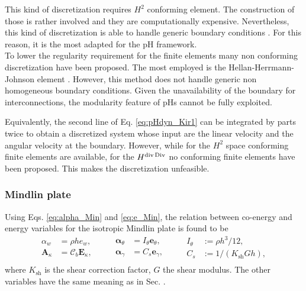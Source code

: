 This kind of discretization requires $H^2$ conforming element. The construction of those is rather involved \cite{argyris1968,bell1969} and they are computationally expensive. Nevertheless, this kind of discretization is able to handle generic boundary conditions \cite{gustafsson2018}. For this reason, it is the most adapted for the pH framework. \\

To lower the regularity requirement for the finite elements many non conforming discretization have been proposed. The most employed is the Hellan-Herrmann-Johnson element \cite{arnold1985mixed,blum1990}. However, this method does not handle generic non homogeneous boundary conditions. Given the unavailability of the boundary for interconnections, the modularity feature of pHs cannot be fully exploited. \\

\begin{remark}\label{rmk:HdivDiv}
	Equivalently, the second line of Eq. \eqref{eq:pHdyn_Kir1} can be integrated by parts twice to obtain a discretized system whose input are the linear velocity and the angular velocity at the boundary. However, while for the $H^2$ space conforming finite elements are available, for the $H^{\operatorname{div}\operatorname*{Div}}$ no conforming finite elements have been proposed. This makes the discretization unfeasible. 
\end{remark}

\subsubsection{Mindlin plate}
Using Eqs. \eqref{eq:alpha_Min} and \eqref{eq:e_Min}, the relation between co-energy and energy variables for the isotropic Mindlin plate is found to be
\begin{equation}
\begin{aligned}
\alpha_w &= \rho h e_w, \\
\bm{A}_{\kappa} &= \bm{\mathcal{C}}_b \bm{E}_\kappa,\\
\end{aligned} \qquad
\begin{aligned}
\bm{\alpha}_{\theta} &= I_\theta \bm{e}_\theta,\\
\bm{\alpha}_{\gamma} &= C_s \bm{e}_{\gamma}, \\
\end{aligned} \qquad
\begin{aligned}
I_\theta &:= {\rho h^3}/{12},\\
C_s &:= {1}/{(K_{\text{sh}}Gh)}, \\
\end{aligned}
\end{equation}
where $K_{\text{sh}}$ is the shear correction factor, $G$ the shear modulus. The other variables have the same meaning as in Sec. . 

